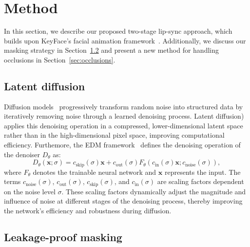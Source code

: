 \section{Method}
\label{sec:method}

In this section, we describe our proposed two-stage lip-sync approach, which builds upon KeyFace's facial animation framework~\cite{keyface}. Additionally, we discuss our masking strategy in Section~\ref{sec:masking} and present a new method for handling occlusions in Section~\ref{sec:occlusions}.

\subsection{Latent diffusion}

Diffusion models~\cite{ho2020ddpm, dhariwal2021diffusionmodelsbeatgans} progressively transform random noise into structured data by iteratively removing noise through a learned denoising process. Latent diffusion)~\cite{rombach2022highresolutionimagesynthesislatent} applies this denoising operation in a compressed, lower-dimensional latent space rather than in the high-dimensional pixel space, improving computational efficiency. Furthemore, the EDM framework~\cite{karras2022elucidatingdesignspacediffusionbased} defines the denoising operation of the denoiser $D_{\theta}$ as:
\begin{equation}
D_\theta(\mathbf{x}; \sigma) = c_{\text{skip}}(\sigma) \mathbf{x} + c_{\text{out}}(\sigma) F_\theta(c_{\text{in}}(\sigma) \mathbf{x}; c_{\text{noise}}(\sigma)),
\end{equation}
where $F_\theta$ denotes the trainable neural network and $\mathbf{x}$ represents the input. The terms $c_{\text{noise}}(\sigma)$, $c_{\text{out}}(\sigma)$, $c_{\text{skip}}(\sigma)$, and $c_{\text{in}}(\sigma)$ are scaling factors dependent on the noise level $\sigma$. These scaling factors dynamically adjust the magnitude and influence of noise at different stages of the denoising process, thereby improving the network's efficiency and robustness during diffusion.

\subsection{Leakage-proof masking} \label{sec:masking}

